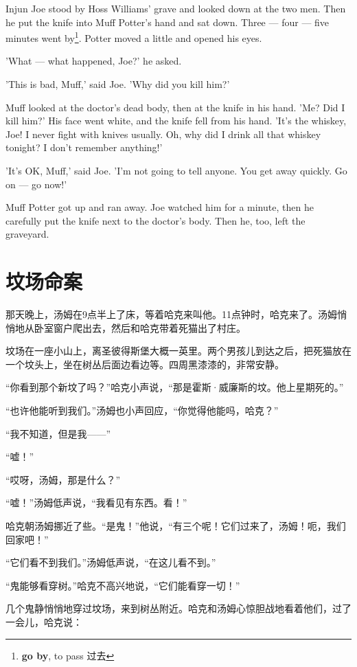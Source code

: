 \documentclass[fontset=ubuntu, zihao=5]{ctexart}
\begin{document}
\begin{paracol}{2}
Injun Joe stood by Hoss Williams' grave and looked down at the two men. Then
he put the knife into Muff Potter's hand and sat down. Three — four — five
minutes went by\footnote{\textbf{go by}, to pass 过去}. Potter moved a little and opened his eyes.

'What — what happened, Joe?' he asked.

'This is bad, Muff,' said Joe. 'Why did you kill him?'

Muff looked at the doctor's dead body, then at the knife in his hand. 'Me? Did I kill him?' His face went white, and the knife fell from his hand. 'It's the whiskey, Joe! I never fight with knives usually. Oh, why did I drink all that whiskey tonight? I don't remember anything!'

'It's OK, Muff,' said Joe. 'I'm not going to tell anyone. You get away quickly. Go on — go now!'

Muff Potter got up and ran away. Joe watched him for a minute, then he carefully put the knife next to the doctor's body. Then he, too, left the graveyard.

\switchcolumn

\section*{坟场命案}

那天晚上，汤姆在9点半上了床，等着哈克来叫他。11点钟时，哈克来了。汤姆悄悄地从卧室窗户爬出去，然后和哈克带着死猫出了村庄。

坟场在一座小山上，离圣彼得斯堡大概一英里。两个男孩儿到达之后，把死猫放在一个坟头上，坐在树丛后面边看边等。四周黑漆漆的，非常安静。

“你看到那个新坟了吗？”哈克小声说，“那是霍斯·威廉斯的坟。他上星期死的。”

“也许他能听到我们。”汤姆也小声回应，“你觉得他能吗，哈克？”

“我不知道，但是我——”

“嘘！”

“哎呀，汤姆，那是什么？”

“嘘！”汤姆低声说，“我看见有东西。看！”

哈克朝汤姆挪近了些。“是鬼！”他说，“有三个呢！它们过来了，汤姆！呃，我们回家吧！”

“它们看不到我们。”汤姆低声说，“在这儿看不到。”

“鬼能够看穿树。”哈克不高兴地说，“它们能看穿一切！”

几个鬼静悄悄地穿过坟场，来到树丛附近。哈克和汤姆心惊胆战地看着他们，过了一会儿，哈克说：


\end{paracol}
\end{document}
